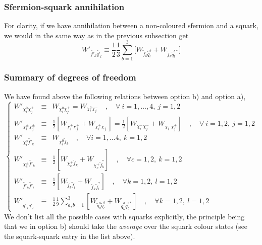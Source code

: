 \documentclass[a4paper,10pt,oneside]{book}
\newcommand{\anl}{\\[1ex]}
\begin{document}
\subsubsection{Sfermion-squark annihilation}
\label{sec:sfsq}

For clarity, if we have annihilation between a non-coloured sfermion and a squark, we would in the same way as in the previous subsection get
\begin{equation}
    W'_{\tilde{f'}_{k} \tilde{q'}_{l}} \equiv 
    \frac{1}{2} \frac{1}{3}\sum_{b=1}^3 \bigg[
    W_{\tilde{f}_{k} \tilde{q}_{l}^b} + 
    W_{\tilde{f}_{k} \tilde{q}_{l}^{b*}} \bigg] 
\end{equation}


\subsubsection{Summary of degrees of freedom}

We have found above the following relations between option b) and option a),
\begin{equation}
  \left\{ \begin{array}{lcl}
  W'_{\chi_{i}^0 \chi_{j}^\pm} & \equiv & W_{\chi_{i}^0 \chi_{j}^+} = 
    W_{\chi_{i}^0 \chi_{j}^-} \quad , \quad \forall\ i=1,\ldots,4,\ 
    j=1,2 \anl
  W'_{\chi_{i}^\pm \chi_{j}^\pm} & \equiv & \frac{1}{2} 
  \left[ W_{\chi_{i}^+ \chi_{j}^+} +  
  W_{\chi_{i}^+ \chi_{j}^-}\right] = 
  \frac{1}{2} \left[ W_{\chi_{i}^- \chi_{j}^-} +  
  W_{\chi_{i}^- \chi_{j}^+}\right] \quad , \quad \forall\ i=1,2,\ j=1,2 \anl
  W'_{\chi_{i}^0 \tilde{f'}_{k}} & \equiv & W_{\chi_{i}^0 \tilde{f}_{k}}
  \quad , \quad \forall i=1,\ldots 4,\ k=1,2 \anl
  W'_{\chi_{c}^\pm \tilde{f'}_{k}} & \equiv &
    \frac{1}{2} \left[ 
    W_{\chi_{c}^+ \tilde{f}_{k}} + 
    W_{\chi_{c}^+ \tilde{f}_{k}^*}
    \right]
  \quad , \quad \forall c=1,2,\ k=1,2 \anl
  W'_{\tilde{f'}_{k} \tilde{f'}_{l}} & \equiv & 
    \frac{1}{2} \left[
    W_{\tilde{f}_{k} \tilde{f}_{l}} + 
    W_{\tilde{f}_{k} \tilde{f}_{l}^*} \right] 
  \quad , \quad \forall k=1,2,\ l=1,2 \anl
  W'_{\tilde{q'}_{k} \tilde{q'}_{l}} & \equiv & 
    \frac{1}{2} \frac{1}{9}\sum_{a,b=1}^3 \left[
    W_{\tilde{q}_{k}^a \tilde{q}_{l}^b} + 
    W_{\tilde{q}_{k}^a \tilde{q}_{l}^{b*}} \right] 
  \quad , \quad \forall k=1,2,\ l=1,2
  \end{array} \right.
\end{equation}
We don't list all the possible cases with squarks explicitly, the principle being that we in option b) should take the \emph{average} over the squark colour states (see the squark-squark entry in the list above).
\end{document}
